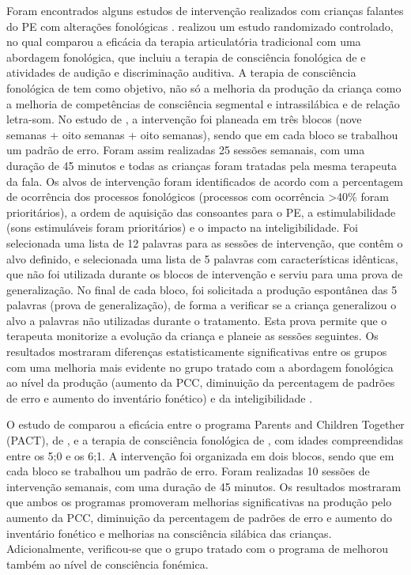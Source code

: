 \documentclass[output=paper,colorlinks,citecolor=brown,booklanguage=portuguese]{langscibook}
\begin{document}
Foram encontrados alguns estudos de intervenção realizados com crianças falantes do PE com alterações fonológicas \citep{Lousada2013, Lousada2014, Pedro2014, Pedro2018}. \citet{Lousada2013} realizou um estudo randomizado controlado, no qual comparou a eficácia da terapia articulatória tradicional com uma abordagem fonológica, que incluiu a terapia de consciência fonológica de \citet{Gillon2007} e atividades de audição e discriminação auditiva. A terapia de consciência fonoló\-gica de \citet{Gillon2007} tem como objetivo, não só a melhoria da produção da criança como a melhoria de competências de consciência segmental e intrassilábica e de relação letra-som. No estudo de \citet{Lousada2013}, a intervenção foi planeada em três blocos (nove semanas + oito semanas + oito semanas), sendo que em cada bloco se trabalhou um padrão de erro. Foram assim realizadas 25 sessões semanais, com uma duração de 45 minutos e todas as crianças foram tratadas pela mesma terapeuta da fala. Os alvos de intervenção foram identificados de acordo com a percentagem de ocorrência dos processos fonológicos (processos com ocorrência >40\% foram prioritários), a ordem de aquisição das consoantes para o PE, a estimulabilidade (sons estimuláveis foram prioritários) e o impacto na inteligibilidade. Foi selecionada uma lista de 12 palavras para as sessões de intervenção, que contêm o alvo definido, e selecionada uma lista de 5 palavras com características idênticas, que não foi utilizada durante os blocos de intervenção e serviu para uma prova de generalização. No final de cada bloco, foi solicitada a produção espontânea das 5 palavras (prova de generalização), de forma a verificar se a criança generalizou o alvo a palavras não utilizadas durante o tratamento. Esta prova permite que o terapeuta monitorize a evolução da criança e planeie as sessões seguintes. Os resultados mostraram diferenças estatisticamente significativas entre os grupos com uma melhoria mais evidente no grupo tratado com a abordagem fonológica ao nível da produção (aumento da PCC, diminuição da percentagem de padrões de erro e aumento do inventário fonético) e da inteligibilidade \citep{Lousada2013, Lousada2014}. 

O estudo de \citet{Pedro2014} comparou a eficácia entre o programa Parents and Children Together (PACT), de \citet{Bowen1999}, e a terapia de consciência fonológica de \citet{Gillon2007}, com idades compreendidas entre os 5;0 e os 6;1. A intervenção foi organizada em dois blocos, sendo que em cada bloco se trabalhou um padrão de erro. Foram realizadas 10 sessões de intervenção semanais, com uma duração de 45 minutos. Os resultados mostraram que ambos os programas promoveram melhorias significativas na produção pelo  aumento da PCC, diminuição da percentagem de padrões de erro e aumento do inventário fonético e melhorias na consciência silábica das crianças. Adicionalmente, verificou-se que o grupo tratado com o programa de \citet{Gillon2007} melhorou também ao nível de consciência fonémica. 
\end{document}
